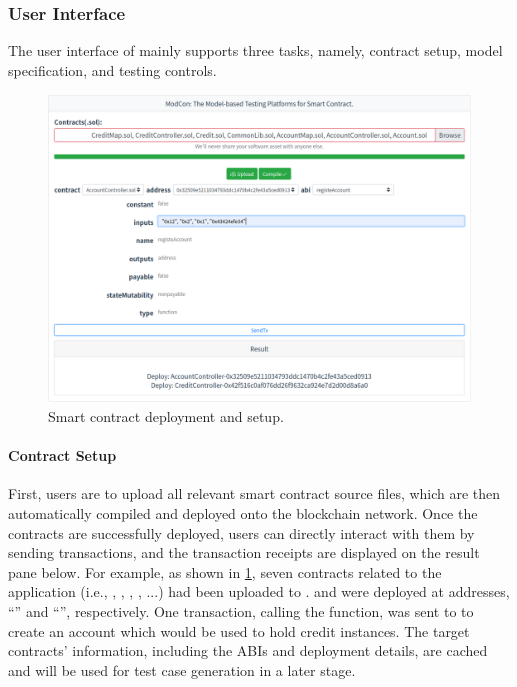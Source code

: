 \subsubsection{User Interface}
The user interface of \modcon mainly supports three tasks, namely, contract setup, model
specification, and testing controls.

\begin{figure}[t]
	\centering
	\includegraphics[width=0.90\columnwidth]{Figures/Chapter3/modcon-home.png}
	\caption{Smart contract deployment and setup.}
	\label{fig:modcon-home}
\end{figure}

\paragraph{Contract Setup}
First, users are to upload all relevant smart contract source files, which are then automatically
compiled and deployed onto the blockchain network.
Once the contracts are successfully deployed, users can directly interact with them by sending
transactions, and the transaction receipts are displayed on the result pane below.
For example, as shown in \cref{fig:modcon-home}, seven contracts related to the \wecredit
application (i.e., , , ,
, ...) had been uploaded to \modcon.
 and  were deployed at addresses,
``'' and ``'', respectively.
One transaction, calling the  function, was sent to 
to create an account which would be used to hold credit instances.
The target contracts' information, including the ABIs and deployment details, are cached and will
be used for test case generation in a later stage.

